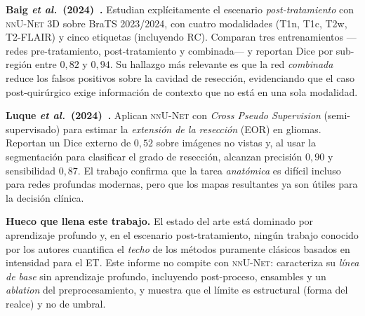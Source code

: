 \documentclass[conference]{IEEEtran}
\begin{document}
\textbf{Baig \emph{et al.}~(2024)~\cite{baig2024nnunet}.} Estudian
explícitamente el escenario \emph{post-tratamiento} con
\textsc{nnU-Net 3D} sobre BraTS 2023/2024, con cuatro modalidades
(T1n, T1c, T2w, T2-FLAIR) y cinco etiquetas (incluyendo RC).
Comparan tres entrenamientos ---redes pre-tratamiento,
post-tratamiento y combinada--- y reportan Dice por sub-región
entre $0{,}82$ y $0{,}94$. Su hallazgo más relevante es que la red
\emph{combinada} reduce los falsos positivos sobre la cavidad de
resección, evidenciando que el caso post-quirúrgico exige
información de contexto que no está en una sola modalidad.

\textbf{Luque \emph{et al.}~(2024)~\cite{luque2024extension}.}
Aplican \textsc{nnU-Net} con \emph{Cross Pseudo Supervision}
(semi-supervisado) para estimar la \emph{extensión de la resección}
(EOR) en gliomas. Reportan un Dice externo de $0{,}52$ sobre
imágenes no vistas y, al usar la segmentación para clasificar el
grado de resección, alcanzan precisión $0{,}90$ y sensibilidad
$0{,}87$. El trabajo confirma que la tarea \emph{anatómica} es
difícil incluso para redes profundas modernas, pero que los mapas
resultantes ya son útiles para la decisión clínica.

\textbf{Hueco que llena este trabajo.} El estado del arte está
dominado por aprendizaje profundo y, en el escenario
post-tratamiento, ningún trabajo conocido por los autores cuantifica
el \emph{techo} de los métodos puramente clásicos basados en
intensidad para el ET. Este informe no compite con \textsc{nnU-Net}:
caracteriza su \emph{línea de base} sin aprendizaje profundo,
incluyendo post-proceso, ensambles y un \emph{ablation} del
preprocesamiento, y muestra que el límite es estructural
(forma del realce) y no de umbral.

\end{document}
